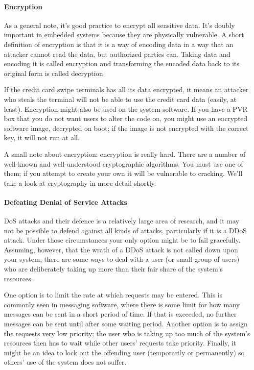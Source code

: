 \paragraph{Encryption} As a general note, it's good practice to encrypt all sensitive data. It's doubly important in embedded systems because they are physically vulnerable. A short definition of encryption is that it is a way of encoding data in a way that an attacker cannot read the data, but authorized parties can. Taking data and encoding it is called encryption and transforming the encoded data back to its original form is called decryption.

If the credit card swipe terminals has all its data encrypted, it means an attacker who steals the terminal will not be able to use the credit card data (easily, at least). Encryption might also be used on the system software. If you have a PVR box that you do not want users to alter the code on, you might use an encrypted software image, decrypted on boot; if the image is not encrypted with the correct key, it will not run at all.  

A small note about encryption: encryption is really hard. There are a number of well-known and well-understood cryptographic algorithms. You must use one of them; if you attempt to create your own it will be vulnerable to cracking. We'll take a look at cryptography in more detail shortly.

\paragraph{Defeating Denial of Service Attacks}
DoS attacks and their defence is a relatively large area of research, and it may not be possible to defend against all kinds of attacks, particularly if it is a DDoS attack. Under those circumstances your only option might be to fail gracefully. Assuming, however, that the wrath of a DDoS attack is not called down upon your system, there are some ways to deal with a user (or small group of users) who are deliberately taking up more than their fair share of the system's resources.

One option is to limit the rate at which requests may be entered. This is commonly seen in messaging software, where there is some limit for how many messages can be sent in a short period of time. If that is exceeded, no further messages can be sent until after some waiting period. Another option is to assign the requests very low priority; the  user who is taking up too much of the system's resources then has to wait while other users' requests take priority. Finally, it might be an idea to lock out the offending user (temporarily or permanently) so others' use of the system does not suffer.

